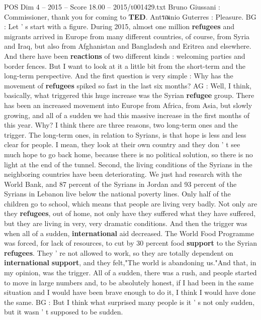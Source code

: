 \begin{textsample}{POS Dim 4 – 2015 – Score 18.00 – 2015/t001429.txt}  \label{ex:f4_pos_054}
Bruno Giussani : Commissioner, thank you for coming to \textbf{TED}.
Antรณnio Guterres : Pleasure.
BG : Let ' s start with a figure.
During 2015, almost one million \textbf{refugees} and migrants arrived in Europe from many different countries, of course, from Syria and Iraq, but also from Afghanistan and Bangladesh and Eritrea and elsewhere.
And there have been \textbf{reactions} of two different kinds : welcoming parties and border fences.
But I want to look at it a little bit from the short-term and the long-term perspective.
And the first question is very simple : Why has the movement of \textbf{refugees} spiked so fast in the last six months?
AG : Well, I think, basically, what triggered this huge increase was the Syrian \textbf{refugee} group.
There has been an increased movement into Europe from Africa, from Asia, but slowly growing, and all of a sudden we had this massive increase in the first months of this year.
Why?
I think there are three reasons, two long-term ones and the trigger.
The long-term ones, in relation to Syrians, is that hope is less and less clear for people.
I mean, they look at their own country and they don ' t see much hope to go back home, because there is no political solution, so there is no light at the end of the tunnel.
Second, the living conditions of the Syrians in the neighboring countries have been deteriorating.
We just had research with the World Bank, and 87 percent of the Syrians in Jordan and 93 percent of the Syrians in Lebanon live below the national poverty lines.
Only half of the children go to school, which means that people are living very badly.
Not only are they \textbf{refugees}, out of home, not only have they suffered what they have suffered, but they are living in very, very dramatic conditions.
And then the trigger was when all of a sudden, \textbf{international} aid decreased.
The World Food Programme was forced, for lack of resources, to cut by 30 percent food \textbf{support} to the Syrian \textbf{refugees}.
They ' re not allowed to work, so they are totally dependent on \textbf{international} \textbf{support}, and they felt,"The world is abandoning us."And that, in my opinion, was the trigger.
All of a sudden, there was a rush, and people started to move in large numbers and, to be absolutely honest, if I had been in the same situation and I would have been brave enough to do it, I think I would have done the same.
BG : But I think what surprised many people is it ' s not only sudden, but it wasn ' t supposed to be sudden.

\end{textsample}
